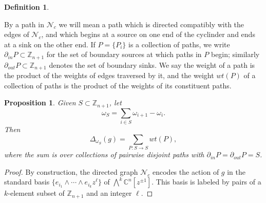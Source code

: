 \documentclass[12pt]{amsart}
\newcommand{\CC}{\mathbb{C}}
\newcommand{\ZZ}{\mathbb{Z}}
\newcommand{\net}{\mathcal{N}} %
\newtheorem{definition}[theorem]{Definition}
\newtheorem{proposition}[theorem]{Proposition}
\numberwithin{equation}{section}
\begin{document}
\begin{definition}
\begin{center}
\end{center}
\end{definition}

By a path in $\net_c$ we will mean a path which is directed compatibly with the edges of $\net_c$, and which begins at a source on one end of the cyclinder and ends at a sink on the other end. 
If $P = \{P_i\}$ is a collection of paths, we write $\partial_{in}P \subset \ZZ_{n+1}$ for the set of boundary sources at which paths in $P$ begin; similarly $\partial_{out}P \subset \ZZ_{n+1}$ denotes the set of boundary sinks. 
We say the weight of a path is the product of the weights of edges traversed by it, and the weight $wt(P)$ of a collection of paths is the product of the weights of its constituent paths.

\begin{proposition}\label{prop:minorsfrompaths}
Given $S \subset \ZZ_{n+1}$, let
\[ \omega_S = \sum_{i \in S} \omega_{i+1} - \omega_i.\] 
Then \[ \Delta_{\omega_S}(g) = \sum_{P: S \to S} wt(P), \]
where the sum is over collections of pairwise disjoint paths with $\partial_{in}P = \partial_{out}P = S$.
\end{proposition}

\begin{proof}
By construction, the directed graph $\net_c$ encodes the action of $g$ in the standard basis $\{ e_{i_1} \wedge \cdots \wedge e_{i_k} z^\ell\}$ of $\bigwedge^k \CC^n[z^{\pm 1}]$. 
This basis is labeled by pairs of a $k$-element subset of $\ZZ_{n+1}$ and an integer $\ell$.
\end{proof}
\end{document}
